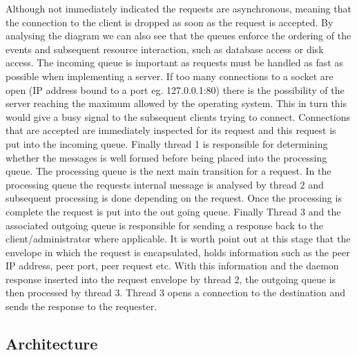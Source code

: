 {			Although not immediately indicated the requests are asynchronous, meaning that the connection to the client
			is dropped as soon as the request is accepted.  By analysing the diagram we can also see that the queues enforce 
			the ordering of the events and subsequent resource interaction, such as database access or disk access.
			\newline
			\newline				
			The incoming queue is important as requests must be handled as fast as possible when implementing a server.
			If too many connections to a socket are open (IP address bound to a port eg. 127.0.0.1:80) there is the
			possibility of the server reaching the maximum allowed by the operating system.  This in turn this would give a busy
			signal to the subsequent clients trying to connect.  Connections that are accepted are immediately inspected
			for its request and this request is put into the incoming queue.  Finally thread 1 is responsible for determining
			whether the messages is well formed before being placed into the processing queue.				
			\newline
			\newline
			The processing queue is the next main transition for a request. In the processing queue the requests internal 
			message is analysed by thread 2 and subsequent processing is done depending on the request.  
			Once the processing is complete the request is put into the out going queue.	
			\newline					
			\newline
			Finally Thread 3 and the associated outgoing queue is responsible for sending a response back to the client/administrator 
			where applicable.  It is worth point out at this stage that the envelope in which the request is encapsulated, 
			holds information such as the peer IP address, peer port, peer request etc.
			\newline
			\newline
			With this information and the daemon response inserted into the request envelope by thread 2, 
			the outgoing queue is then processed by thread 3.  Thread 3 opens a connection to the destination and sends the response
			to the requester.					
		}				

	\vspace{4mm}
	\subsection{Architecture}
		\label{sec:serverarch}
		
